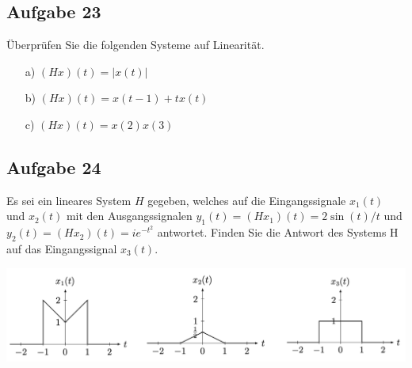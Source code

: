 \documentclass[11pt]{article}
\begin{document}
\subsection*{Aufgabe 23}
\vspace*{-0.5cm}
Überprüfen Sie die folgenden Systeme auf Linearität.
\begin{multicols}{3}
    \begin{itemize}
        \item[a)] $(Hx)(t) = |x(t)|$
        \item[b)] $(Hx)(t) = x(t-1)+tx(t)$
        \item[c)] $(Hx)(t) = x(2)x(3)$
    \end{itemize}
\end{multicols}



\pagebreak


\subsection*{Aufgabe 24}
\vspace*{-0.5cm}
Es sei ein lineares System $H$ gegeben, welches auf die Eingangssignale $x_1(t)$ und $x_2(t)$ mit den Ausgangssignalen $y_1(t) = (Hx_1)(t) = 2 \sin (t)/t$ und $y_2(t) = (Hx_2)(t) = i e^{-t^2}$ antwortet. Finden Sie die Antwort des Systems H auf das Eingangssignal $x_3(t)$.
\vspace*{-0.5cm}
\begin{center}
    \includegraphics[width=\linewidth]{docimgs/Aufgabe_24_signale.png}
\end{center}
\end{document}

